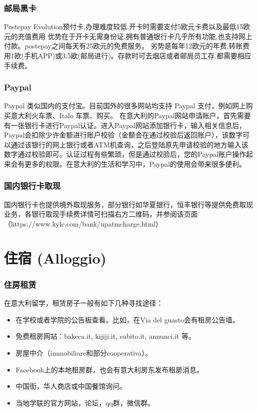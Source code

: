 \subsubsection{邮局黑卡}

Postepay Evolution预付卡,办理难度较低.开卡时需要支付5欧元卡费以及最低15欧元的充值费用
优势在于开卡无需身份证,拥有普通银行卡几乎所有功能,也支持网上付款。postepay之间每天有25欧元的免费服务。
劣势是每年12欧元的年费,转账费用1欧(手机APP)或3.5欧(邮局进行)。存款时可去烟店或者邮局员工存,都需要相应手续费。

\subsubsection{Paypal}

Paypal 类似国内的支付宝。目前国外的很多网站均支持 Paypal 支付，例如网上购买意大利火车票、Italo 车票、购买。
在意大利的Paypal网站申请账户，首先需要有一张银行卡进行Paypal认证。进入Paypal网站添加银行卡，输入相关信息后，Paypal会扣除少许金额进行账户校验（金额会在通过校验后返回账户），该数字可以通过该银行的网上银行或者ATM机查询，之后登陆原先申请校验的地方输入该数字通过校验即可。认证过程有些繁琐，但是通过校验后，您的Paypal账户操作起来会有更多的权限。在意大利的生活和学习中，Paypal的使用会带来很多便利。

\subsubsection{国内银行卡取现}
国内银行卡也提供境外取现服务，部分银行如华夏银行，恒丰银行等提供免费取现业务，各银行取现手续费详情可扫描右方二维码，并参阅该页面（https://www.kylc.com/bank/upatmcharge.html）

\section{住宿 (Alloggio)}
\subsubsection{住房租赁}

在意大利留学，租赁房子一般有如下几种寻找途径：



\begin{itemize} 
\item 在学校或者学院的公告板查看。比如，在Via del guasto会有租房公告墙。
\item 免费租房网站：bakeca.it, kijiji.it, subito.it, annunci.it 等。
\item 房屋中介（immobiliare和部分cooperativa）。
\item Facebook上的本地租房群，也会有意大利房东发布租房消息。
\item 中国街，华人商店或中国餐馆询问。 
\item 当地学联的官方网站，论坛，qq群，微信群。
\end{itemize} 
